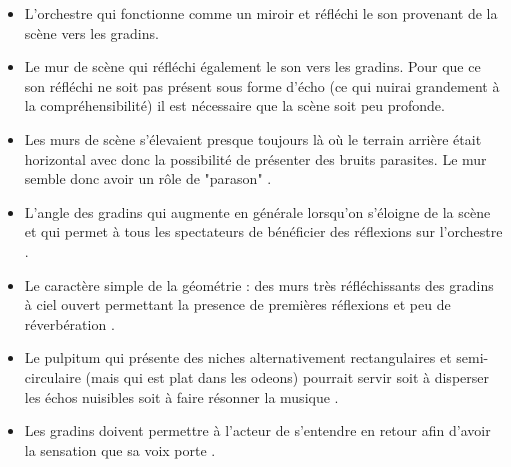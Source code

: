 \begin{itemize}
\item L'orchestre qui fonctionne comme un miroir et réfléchi le son provenant de la scène vers les gradins.
\item Le mur de scène qui réfléchi également le son vers les gradins. Pour que ce son réfléchi ne soit pas présent sous forme d'écho (ce qui nuirai grandement à la compréhensibilité) il est nécessaire que la scène soit peu profonde.
\item Les murs de scène s'élevaient presque toujours là où le terrain arrière était horizontal avec donc la possibilité de présenter des bruits parasites. Le mur semble donc avoir un rôle de "parason" \cite[p.38]{canac}.
\item L'angle des gradins qui augmente en générale lorsqu'on s'éloigne de la scène et qui permet à tous les spectateurs de bénéficier des réflexions sur l'orchestre \cite[p.103-109]{canac}.
\item Le caractère simple de la géométrie : des murs très réfléchissants des gradins à ciel ouvert permettant la presence de premières réflexions et peu de réverbération \cite[p.33]{canac}.
\item Le \gls{pulpitum} qui présente des niches alternativement rectangulaires et semi-circulaire (mais qui est plat dans les \glspl{odeon}) pourrait servir soit à disperser les échos nuisibles soit à faire résonner la musique \cite[p.38]{canac}.
\item Les gradins doivent permettre à l'acteur de s'entendre en retour afin d'avoir la sensation que sa voix porte \cite[p.42 - tab.II-4]{canac}.
\end{itemize}
